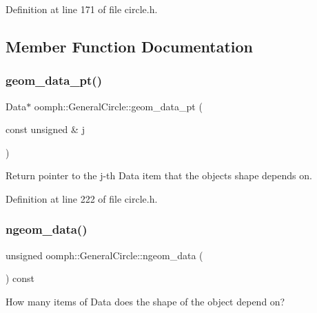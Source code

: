 Definition at line 171 of file circle.\+h.



\subsection{Member Function Documentation}
\mbox{\label{classoomph_1_1GeneralCircle_ad5c33bb9a727a8fe28be0087f5baa9f5}} 
\subsubsection{\texorpdfstring{geom\+\_\+data\+\_\+pt()}{geom\_data\_pt()}}
{\footnotesize\ttfamily Data$\ast$ oomph\+::\+General\+Circle\+::geom\+\_\+data\+\_\+pt (\begin{DoxyParamCaption}\item[{const unsigned \&}]{j }\end{DoxyParamCaption})\hspace{0.3cm}{\ttfamily [inline]}}



Return pointer to the j-\/th Data item that the object\textquotesingle{}s shape depends on. 



Definition at line 222 of file circle.\+h.

\mbox{\label{classoomph_1_1GeneralCircle_a7cd69f069bb8042ba972b89940ec1808}} 
\subsubsection{\texorpdfstring{ngeom\+\_\+data()}{ngeom\_data()}}
{\footnotesize\ttfamily unsigned oomph\+::\+General\+Circle\+::ngeom\+\_\+data (\begin{DoxyParamCaption}{ }\end{DoxyParamCaption}) const\hspace{0.3cm}{\ttfamily [inline]}}



How many items of Data does the shape of the object depend on? 



